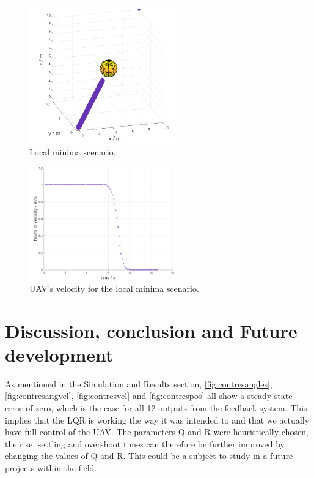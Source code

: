 \documentclass[journal, twoside]{IEEEtran}
\begin{document}
		\begin{figure}[h]
			\centering
			\includegraphics[width=2.5in]{Results/Potentialfields/localminima}
			\caption{Local minima scenario.}
			\label{fig:localminima}
		\end{figure}
		\begin{figure}[h]
			\centering
			\includegraphics[width=2.5in]{Results/Potentialfields/localminima_velocity}
			\caption{UAV's velocity for the local minima scenario.}
			\label{fig:localminima_velocity}
		\end{figure}
		
	\section{Discussion, conclusion and Future development}
	As mentioned in the Simulation and Results section, \figurename{ \ref{fig:contresangles}}, \figurename{ \ref{fig:contresangvel}}, \figurename{ \ref{fig:contresvel}} and \figurename{ \ref{fig:contrespos}} all show a steady state error of zero, which is the case for all 12 outputs from the feedback system. This implies that the LQR is working the way it was intended to and that we actually have full control of the UAV. The parameters Q and R were heuristically chosen, the rise, settling and overshoot times can therefore be further improved by changing the values of Q and R. This could be a subject to study in a  future projects within the field. \\
\end{document}

